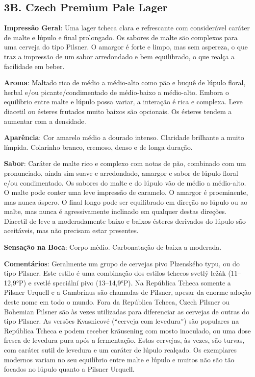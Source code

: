 \subsection*{3B. Czech Premium Pale Lager}

\textbf{Impressão Geral}: Uma lager tcheca clara e refrescante com considerável caráter de malte e lúpulo e final prolongado. Os sabores de malte são complexos para uma cerveja do tipo Pilsner. O amargor é forte e limpo, mas sem aspereza, o que traz a impressão de um sabor arredondado e bem equilibrado, o que realça a facilidade em beber.

\textbf{Aroma}: Maltado rico de médio a médio-alto como pão e buquê de lúpulo floral, herbal e/ou picante/condimentado de médio-baixo a médio-alto. Embora o equilíbrio entre malte e lúpulo possa variar, a interação é rica e complexa. Leve diacetil ou ésteres frutados muito baixos são opcionais. Os ésteres tendem a aumentar com a densidade.

\textbf{Aparência}: Cor amarelo médio a dourado intenso. Claridade brilhante a muito límpida. Colarinho branco, cremoso, denso e de longa duração.

\textbf{Sabor}: Caráter de malte rico e complexo com notas de pão, combinado com um pronunciado, ainda sim suave e arredondado, amargor e sabor de lúpulo floral e/ou condimentado. Os sabores do malte e do lúpulo vão de médio a médio-alto. O malte pode conter uma leve impressão de caramelo. O amargor é proeminente, mas nunca áspero. O final longo pode ser equilibrado em direção ao lúpulo ou ao malte, mas nunca é agressivamente inclinado em qualquer destas direções. Diacetil de leve a moderadamente baixo e baixos ésteres derivados do lúpulo são aceitáveis, mas não precisam estar presentes.

\textbf{Sensação na Boca}: Corpo médio. Carbonatação de baixa a moderada.

\textbf{Comentários}: Geralmente um grupo de cervejas pivo Plzenského typu, ou do tipo Pilsner. Este estilo é uma combinação dos estilos tchecos svetlý ležák (11–12,9°P) e svetlé speciální pivo (13–14,9°P). Na República Tcheca somente a Pilsner Urquell e a Gambrinus são chamadas de Pilsner, apesar da enorme adoção deste nome em todo o mundo. Fora da República Tcheca, Czech Pilsner ou Bohemian Pilsner são às vezes utilizadas para diferenciar as cervejas de outras do tipo Pilsner. As versões Kvasnicové (“cerveja com levedura”) são populares na República Tcheca e podem receber kräusening com mosto inoculado, ou uma dose fresca de levedura pura após a fermentação. Estas cervejas, às vezes, são turvas, com caráter sutil de levedura e um caráter de lúpulo realçado. Os exemplares modernos variam no seu equilíbrio entre malte e lúpulo e muitos não são tão focados no lúpulo quanto a Pilsner Urquell.

